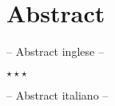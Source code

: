 \chapter*{Abstract}\label{abstract}
 -- Abstract inglese --\\
\vspace{50pt}
\begin{center}
\large$\star\star\star$
\end{center}
\vspace{50pt}
 -- Abstract italiano --\\

